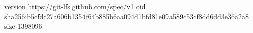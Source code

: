 version https://git-lfs.github.com/spec/v1
oid sha256:b5cfdc27a606b1354f64b885b6aa094d1bfd81e09a589c53cf8dd6dd3e36a2a8
size 1398096
